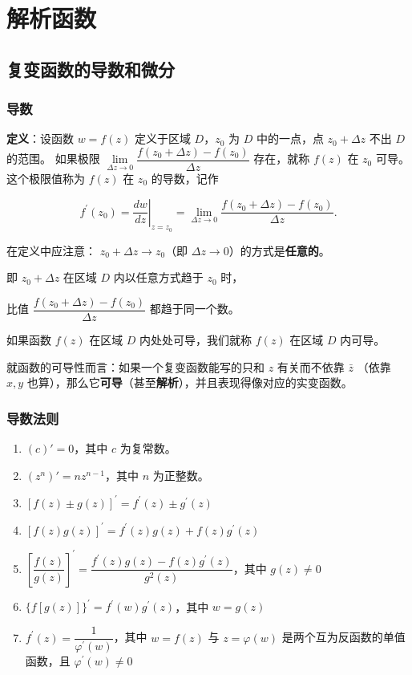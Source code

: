 \section{解析函数}
\label{解析函数}
\subsection{复变函数的导数和微分}
\label{复变函数的导数和微分}
\subsubsection{导数}
\label{导数}
\textbf{定义}：设函数 \(w=f(z)\) 定义于区域 \(D\)，\(z_{0}\) 为 \(D\)
中的一点，点 \(z_{0}+\Delta{z}\) 不出 \(D\) 的范围。 如果极限
\(\lim\limits_{\Delta{z} \to 0} \dfrac{f(z_{0}+\Delta{z})-f(z_{0})}{\Delta{z}}\)
存在，就称 \(f(z)\) 在 \(z_{0}\) 可导。 这个极限值称为 \(f(z)\) 在
\(z_{0}\) 的导数，记作

\[
f^{\prime}(z_{0})=\left.\dfrac{dw}{dz}\right|_{z=z_{0}}=\lim_{\Delta{z} \to 0} \dfrac{f(z_{0}+\Delta{z})-f(z_{0})}{\Delta{z}}.
\]

\begin{tcolorbox}[title={Note},colback=red!5!white
,colframe=red!75!black
,colbacktitle=yellow!50!red
,coltitle=red!25!black, fonttitle=\bfseries,subtitle style={boxrule=0.4pt, colback=yellow!50!red!25!white}]
在定义中应注意：
\(z_{0}+\Delta z \to z_{0}\)（即 \(\Delta z \to 0\)）的方式是\textbf{任意的}。

即 \(z_{0}+\Delta z\) 在区域 \(D\) 内以任意方式趋于 \(z_{0}\) 时，

比值 \(\dfrac{f(z_{0}+\Delta z)-f(z_{0})}{\Delta z}\) 都趋于同一个数。

如果函数 \(f(z)\) 在区域 \(D\) 内处处可导，我们就称 \(f(z)\) 在区域 \(D\) 内可导。

\end{tcolorbox}

就函数的可导性而言：如果一个复变函数能写的只和 \(z\) 有关而不依靠
\(\bar{z}\) （依靠 \(x,y\)
也算），那么它\textbf{可导}（甚至\textbf{解析}），并且表现得像对应的实变函数。
\subsubsection{导数法则}
\label{导数法则}
\begin{enumerate}
\item \((c)' = 0\)，其中 \(c\) 为复常数。
\item \((z^{n})' = nz^{n-1}\)，其中 \(n\) 为正整数。
\item \([f(z)\pm g(z)]^{\prime}=f^{\prime}(z)\pm g^{\prime}(z)\)
\item \([f(z)g(z)]^{\prime}=f^{\prime}(z)g(z)+f(z)g^{\prime}(z)\)
\item \(\left[\dfrac{f(z)}{g(z)}\right]^{\prime}=\dfrac{f^{\prime}(z)g(z)-f(z)g^{\prime}(z)}{g^{2}(z)}\)，其中
\(g(z)\neq 0\)
\item \(\{f[g(z)]\}^{\prime}=f^{\prime}(w)g^{\prime}(z)\)，其中 \(w=g(z)\)
\item \(f^{\prime}(z)=\dfrac{1}{\varphi^{\prime}(w)}\)，其中 \(w=f(z)\) 与
\(z=\varphi(w)\) 是两个互为反函数的单值函数，且
\(\varphi^{\prime}(w)\neq 0\)
\end{enumerate}
